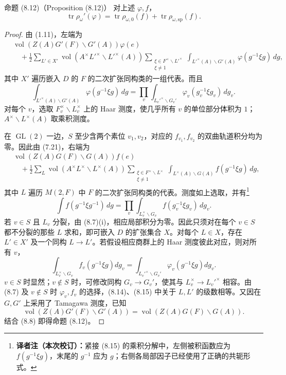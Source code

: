 \begin{originaltheorem}{命题 (8.12)（Proposition (8.12)）}
对上述 $\varphi,f$，
\begin{equation}
 \operatorname{tr}\rho_\omega'(\varphi)
 =\operatorname{tr}\rho_{\omega,0}(f)+\operatorname{tr}\rho_{\omega,\mathrm{sp}}(f).\tag{8.13}
\end{equation}
\end{originaltheorem}
\begin{proof}
由 (1.11)，左端为
\begin{equation}
\begin{split}
 &\operatorname{vol}(Z(A)G'(F)\backslash G'(A))\varphi(e)\\
 &\quad+\frac12\sum_{L'\in X'}\operatorname{vol}(A^\times L'^\times\backslash L'^\times(A))
 \sum_{\substack{\xi\in F^\times\backslash L'^\times\\\xi\ne1}}
 \int_{L'^\times(A)\backslash G'(A)}\varphi(g^{-1}\xi g)\,dg,
\end{split}\tag{8.14}
\end{equation}
其中 $X'$ 遍历嵌入 $D$ 的 $F$ 的二次扩张同构类的一组代表。而且
\[
 \int_{L'^\times(A)\backslash G'(A)}\varphi(g^{-1}\xi g)\,dg
 =\prod_v\int_{L_v'^\times\backslash G_v'}\varphi_v(g_v^{-1}\xi g_v)\,dg_v.
\]
对每个 $v$，选取 $F_v^\times\backslash L_v^\times$ 上的 Haar 测度，使几乎所有 $v$ 的单位部分体积为
$1$；$A^\times\backslash L^\times(A)$ 取乘积测度。

在 $\operatorname{GL}(2)$ 一边，$S$ 至少含两个素位 $v_1,v_2$，对应的 $f_{v_1},f_{v_2}$ 的双曲轨道积分均为零。因此由 (7.21)，右端为
\begin{equation}
\begin{split}
 &\operatorname{vol}(Z(A)G(F)\backslash G(A))f(e)\\
 &\quad+\frac12\sum_L\operatorname{vol}(A^\times L^\times\backslash L^\times(A))
 \sum_{\substack{\xi\in F^\times\backslash L^\times\\\xi\ne1}}
 \int_{L^\times(A)\backslash G(A)}f(g^{-1}\xi g)\,dg,
\end{split}\tag{8.15}
\end{equation}
其中 $L$ 遍历 $M(2,F)$ 中 $F$ 的二次扩张同构类的代表。测度如上选取，并有\footnote{\textbf{译者注（本次校订）：}紧接 (8.15) 的乘积分解中，左侧被积函数应为 $f(g^{-1}\xi g)$，末尾的 $g^{-1}$ 应为 $g$；右侧各局部因子已经使用了正确的共轭形式。}
\[
 \int f(g^{-1}\xi g^{-1})\,dg
 =\prod_v\int_{L_v^\times\backslash G_v}f(g_v^{-1}\xi g_v)\,dg_v.
\]
若 $v\in S$ 且 $L_v$ 分裂，由 (8.7)(i)，相应局部积分为零。因此只须对在每个
$v\in S$ 都不分裂的那些 $L$ 求和，即可嵌入 $D$ 的扩张集合 $X$。对每个 $L\in X$，存在
$L'\in X'$ 及一个同构
$L\to L'$。若假设相应商群上的 Haar 测度彼此对应，则对所有 $v$，
\[
 \int_{L_v^\times\backslash G_v}f_v(g^{-1}\xi g)dg_v
 =\int_{L_v'^\times\backslash G_v'}\varphi_v(g^{-1}\xi g)dg_v.
\]
$v\in S$ 时显然；$v\notin S$ 时，可修改同构 $G_v\to G_v'$，使其与
$L_v^\times\to L_v'^\times$ 相容。由 (8.7) 及 $v\notin S$ 时 $\varphi_v,f_v$ 的选择，(8.14)、(8.15) 中关于 $L,L'$ 的级数相等。又因在 $G,G'$ 上采用了 Tamagawa 测度，已知
\[
 \operatorname{vol}(Z(A)G'(F)\backslash G'(A))
 =\operatorname{vol}(Z(A)G(F)\backslash G(A)).
\]
结合 (8.8) 即得命题 (8.12)。
\end{proof}

